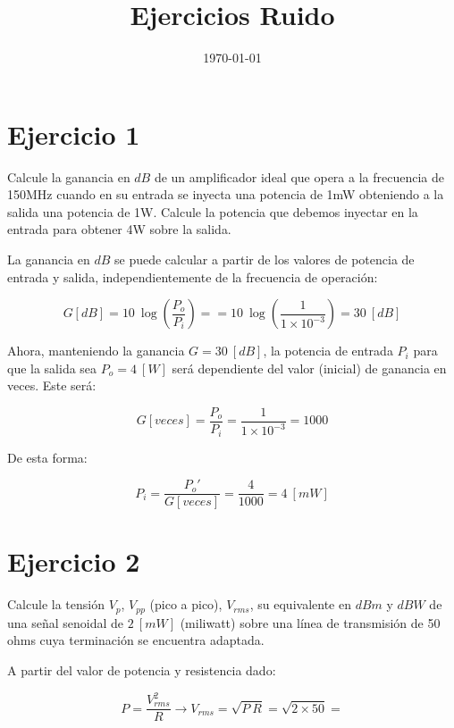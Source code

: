 \documentclass[conference]{IEEEtran}
\date{\today}
\title{Ejercicios Ruido}
\begin{document}
\maketitle
\tableofcontents


\section{Ejercicio 1}
\label{sec:org8b4a3b6}

Calcule la ganancia en \(dB\) de un amplificador ideal que opera a la frecuencia de 150MHz cuando en su entrada se inyecta una potencia de 1mW obteniendo a la salida una potencia de 1W. Calcule la potencia que debemos inyectar en la entrada para obtener 4W sobre la salida.

La ganancia en \(dB\) se puede calcular a partir de los valores de potencia de entrada y salida, independientemente de la frecuencia de operación:

\begin{equation}
    G[dB] = 10 \: \log{\left( \frac{P_o}{P_i} \right)} =
          = 10 \: \log{\left( \frac{1}{1\times 10^{-3}} \right)}
          = 30 \: [dB]
\end{equation}

Ahora, manteniendo la ganancia \(G = 30 \: [dB]\), la potencia de entrada \(P_i\) para que la salida sea \(P_o = 4 \: [W]\) será dependiente del valor (inicial) de ganancia en veces. Este será:

\begin{equation}
    G[veces] = \frac{P_o}{P_i} = \frac{1}{1 \times 10^{-3}} = 1000
\end{equation}

De esta forma:

\begin{equation}
    P_i = \frac{P_o'}{G[veces]} = \frac{4}{1000} = 4 \: [mW]
\end{equation}
\section{Ejercicio 2}
\label{sec:orgcb6dd78}
Calcule la tensión \(V_p\), \(V_{pp}\) (pico a pico), \(V_{rms}\), su equivalente en \(dBm\) y \(dBW\) de una señal senoidal de \(2\:[mW]\) (miliwatt) sobre una línea de transmisión de 50 ohms cuya terminación se encuentra adaptada.

A partir del valor de potencia y resistencia dado:

\begin{equation}
    P = \frac{V_{rms}^2}{R} \rightarrow
    V_{rms} = \sqrt{P \: R} = \sqrt{2\times 50} =
\end{equation}
\end{document}
